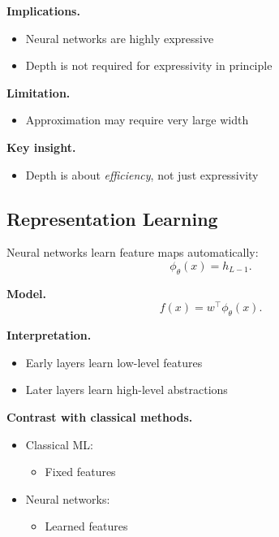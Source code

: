 \medskip

\noindent
\textbf{Implications.}
\begin{itemize}
    \item Neural networks are highly expressive
    \item Depth is not required for expressivity in principle
\end{itemize}

\medskip

\noindent
\textbf{Limitation.}
\begin{itemize}
    \item Approximation may require very large width
\end{itemize}

\medskip

\noindent
\textbf{Key insight.}
\begin{itemize}
    \item Depth is about \emph{efficiency}, not just expressivity
\end{itemize}

\subsection{Representation Learning}

Neural networks learn feature maps automatically:
\[
\phi_\theta(x) = h_{L-1}.
\]

\medskip

\noindent
\textbf{Model.}
\[
f(x) = w^\top \phi_\theta(x).
\]

\medskip

\noindent
\textbf{Interpretation.}
\begin{itemize}
    \item Early layers learn low-level features
    \item Later layers learn high-level abstractions
\end{itemize}

\medskip

\noindent
\textbf{Contrast with classical methods.}
\begin{itemize}
    \item Classical ML:
    \begin{itemize}
        \item Fixed features
    \end{itemize}
    \item Neural networks:
    \begin{itemize}
        \item Learned features
    \end{itemize}
\end{itemize}

